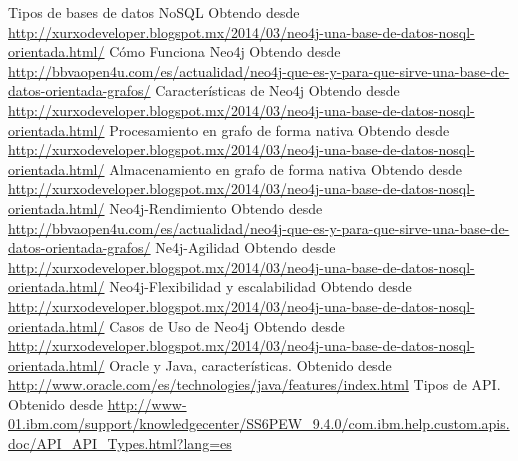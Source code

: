 \begin{thebibliography}{1}
    Tipos de bases de datos NoSQL Obtendo desde \url{http://xurxodeveloper.blogspot.mx/2014/03/neo4j-una-base-de-datos-nosql-orientada.html/}	
    Cómo Funciona Neo4j Obtendo desde \url{http://bbvaopen4u.com/es/actualidad/neo4j-que-es-y-para-que-sirve-una-base-de-datos-orientada-grafos/}
    Características de Neo4j Obtendo desde \url{http://xurxodeveloper.blogspot.mx/2014/03/neo4j-una-base-de-datos-nosql-orientada.html/}	
    Procesamiento en grafo de forma nativa Obtendo desde \url{http://xurxodeveloper.blogspot.mx/2014/03/neo4j-una-base-de-datos-nosql-orientada.html/}	
    Almacenamiento en grafo de forma nativa Obtendo desde \url{http://xurxodeveloper.blogspot.mx/2014/03/neo4j-una-base-de-datos-nosql-orientada.html/}	
    Neo4j-Rendimiento Obtendo desde \url{http://bbvaopen4u.com/es/actualidad/neo4j-que-es-y-para-que-sirve-una-base-de-datos-orientada-grafos/}	
   	 Ne4j-Agilidad Obtendo desde \url{http://xurxodeveloper.blogspot.mx/2014/03/neo4j-una-base-de-datos-nosql-orientada.html/}	
    Neo4j-Flexibilidad y escalabilidad Obtendo desde \url{http://xurxodeveloper.blogspot.mx/2014/03/neo4j-una-base-de-datos-nosql-orientada.html/}
    Casos de Uso de Neo4j Obtendo desde \url{http://xurxodeveloper.blogspot.mx/2014/03/neo4j-una-base-de-datos-nosql-orientada.html/}	
    Oracle y Java, características. Obtenido desde \url{http://www.oracle.com/es/technologies/java/features/index.html}
   Tipos de API. Obtenido desde \url{http://www-01.ibm.com/support/knowledgecenter/SS6PEW_9.4.0/com.ibm.help.custom.apis.doc/API_API_Types.html?lang=es}
\end{thebibliography}
